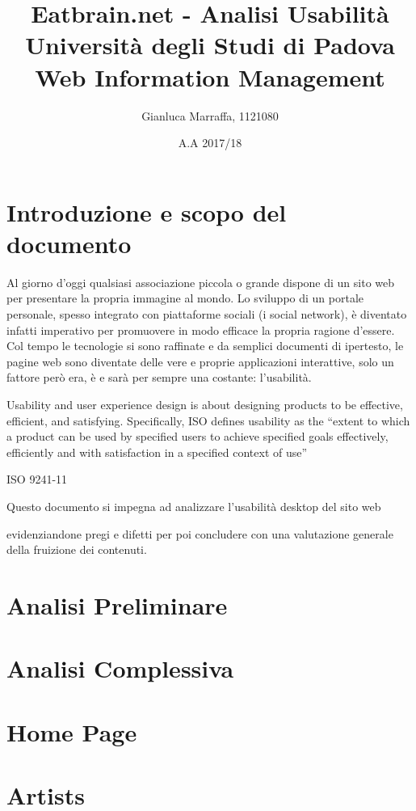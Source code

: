 \documentclass[10pt,a4paper]{article}
\title{
  Eatbrain.net - Analisi Usabilità \\
  Università degli Studi di Padova \\
  Web Information Management
}
\author{
  Gianluca Marraffa, 1121080
}
\date{A.A 2017/18}
\newcommand{\URI}[3][blue]{\href{#2}{\color{#1}{#3}}}%
\begin{document}
\maketitle
\newpage
{}
\tableofcontents
\newpage
{}

\section{Introduzione e scopo del documento}
Al giorno d'oggi qualsiasi associazione piccola o grande dispone di un sito web per presentare la propria immagine al mondo. Lo sviluppo di un portale personale, spesso integrato con piattaforme sociali (i social network), è diventato infatti imperativo per promuovere in modo efficace la propria ragione d'essere. Col tempo le tecnologie si sono raffinate e da semplici documenti di ipertesto, le pagine web sono diventate delle vere e proprie applicazioni interattive, solo un fattore però era, è e sarà per sempre una costante: l'usabilità.
\setlength{\epigraphwidth}{0.8\textwidth}
\epigraph{Usability and user experience design is about designing products to be effective, efficient, and satisfying. Specifically, ISO defines usability as the “extent to which a product can be used by specified users to achieve specified goals effectively, efficiently and with satisfaction in a specified context of use”}{ISO 9241-11}
Questo documento si impegna ad analizzare l'usabilità desktop del sito web
\begin{center}
	\URI{https://eatbrain.net/}{eatbrain.net}
\end{center}
 evidenziandone pregi e difetti per poi concludere con una valutazione generale della fruizione dei contenuti.
\newpage

\section{Analisi Preliminare}

\section{Analisi Complessiva}

\section{Home Page}
\section{Artists}
\end{document}
